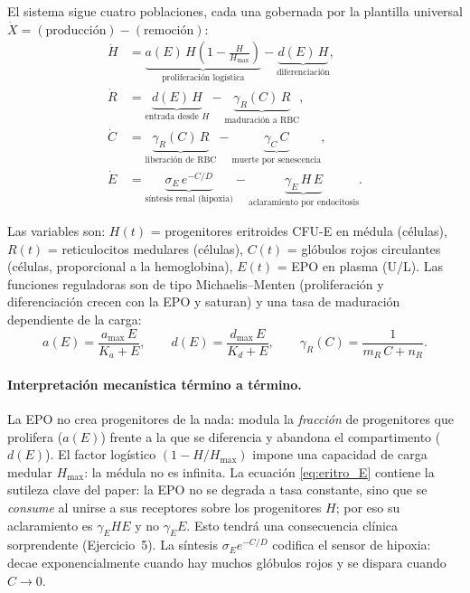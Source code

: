 El sistema sigue cuatro poblaciones, cada una gobernada por la plantilla universal $\dot X = (\text{producción}) - (\text{remoción})$:
\begin{align}
    \dot{H} &= \underbrace{a(E)\,H\left(1 - \frac{H}{H_{\max}}\right)}_{\text{proliferación logística}} - \underbrace{d(E)\,H}_{\text{diferenciación}}, \label{eq:eritro_H}\\[4pt]
    \dot{R} &= \underbrace{d(E)\,H}_{\text{entrada desde }H} - \underbrace{\gamma_R(C)\,R}_{\text{maduración a RBC}}, \label{eq:eritro_R}\\[4pt]
    \dot{C} &= \underbrace{\gamma_R(C)\,R}_{\text{liberación de RBC}} - \underbrace{\gamma_C\,C}_{\text{muerte por senescencia}}, \label{eq:eritro_C}\\[4pt]
    \dot{E} &= \underbrace{\sigma_E\,e^{-C/D}}_{\text{síntesis renal (hipoxia)}} - \underbrace{\gamma_E\,H\,E}_{\text{aclaramiento por endocitosis}}. \label{eq:eritro_E}
\end{align}

Las variables son: $H(t)$ = progenitores eritroides CFU-E en médula (células), $R(t)$ = reticulocitos medulares (células), $C(t)$ = glóbulos rojos circulantes (células, proporcional a la hemoglobina), $E(t)$ = EPO en plasma (U/L). Las funciones reguladoras son de tipo Michaelis--Menten (proliferación y diferenciación crecen con la EPO y saturan) y una tasa de maduración dependiente de la carga:
\begin{equation}
    a(E) = \frac{a_{\max}\,E}{K_a + E}, \qquad
    d(E) = \frac{d_{\max}\,E}{K_d + E}, \qquad
    \gamma_R(C) = \frac{1}{m_R\,C + n_R}.
    \label{eq:eritro_MM}
\end{equation}

\paragraph{Interpretación mecanística término a término.} La EPO no crea progenitores de la nada: modula la \emph{fracción} de progenitores que prolifera ($a(E)$) frente a la que se diferencia y abandona el compartimento ($d(E)$). El factor logístico $(1-H/H_{\max})$ impone una capacidad de carga medular $H_{\max}$: la médula no es infinita. La ecuación \eqref{eq:eritro_E} contiene la sutileza clave del paper: la EPO no se degrada a tasa constante, sino que se \emph{consume} al unirse a sus receptores sobre los progenitores $H$; por eso su aclaramiento es $\gamma_E H E$ y no $\gamma_E E$. Esto tendrá una consecuencia clínica sorprendente (Ejercicio~5). La síntesis $\sigma_E e^{-C/D}$ codifica el sensor de hipoxia: decae exponencialmente cuando hay muchos glóbulos rojos y se dispara cuando $C\to 0$.


